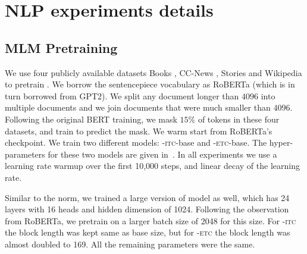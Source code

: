 \section{NLP experiments details}
\label{sec:apndx-expt-nlp}

\subsection{MLM Pretraining}
\label{sec:app-expt-nlp:mlm}

We use four publicly available datasets Books \citep{zhu2015aligning}, CC-News \citep{guu2020realm}, Stories \citep{trinh2018simple} and Wikipedia to pretrain \bigb. 
We borrow the sentencepiece vocabulary as RoBERTa (which is in turn borrowed from GPT2).
We split any document longer than $4096$ into multiple documents and we join documents that were much smaller than $4096$.
Following the original BERT training, we mask $15\%$ of tokens in these four datasets, and train to predict the mask. We warm start from RoBERTa's checkpoint. 
We train two different models: \bigb-\textsc{itc}-base and \bigb-\textsc{etc}-base. The hyper-parameters for these two models are given in~. In all experiments we use a learning
rate warmup over the first 10,000 steps, and linear
decay of the learning rate. 

Similar to the norm, we trained a large version of model as well, which has 24 layers with 16 heads and hidden dimension of 1024.
Following the observation from RoBERTa, we pretrain on a larger batch size of 2048 for this size.
For \bigb-\textsc{itc} the block length was kept same as base size, but for \bigb-\textsc{etc} the block length was almost doubled to 169. All the remaining parameters were the same.


